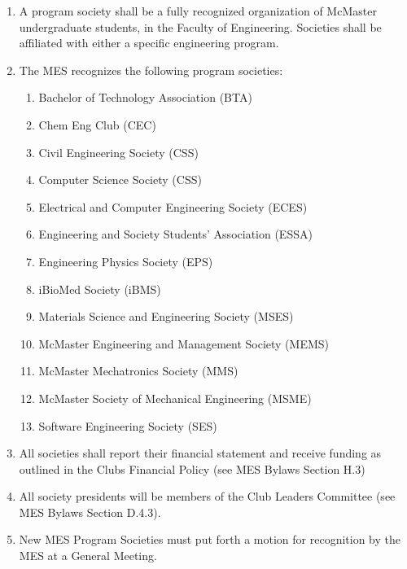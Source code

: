 \begin{enumerate}
 \item
  A program society shall be a fully recognized organization of McMaster
  undergraduate students, in the Faculty of Engineering. Societies shall
  be affiliated with either a specific engineering program.
 \item
  The MES recognizes the following program societies:

  \begin{enumerate}
   \item
    Bachelor of Technology Association (BTA)
   \item
    Chem Eng Club (CEC)
   \item
    Civil Engineering Society (CSS)
   \item
    Computer Science Society (CSS)
   \item
    Electrical and Computer Engineering Society (ECES)
   \item
    Engineering and Society Students' Association (ESSA)
   \item
    Engineering Physics Society (EPS)
   \item
    iBioMed Society (iBMS)
   \item
    Materials Science and Engineering Society (MSES)
   \item
    McMaster Engineering and Management Society (MEMS)
   \item
    McMaster Mechatronics Society (MMS)
   \item
    McMaster Society of Mechanical Engineering (MSME)
   \item
    Software Engineering Society (SES)
  \end{enumerate}
 \item
  All societies shall report their financial statement and receive
  funding as outlined in the Clubs Financial Policy (see MES Bylaws
  Section H.3)
 \item
  All society presidents will be members of the Club Leaders Committee
  (see MES Bylaws Section D.4.3).
 \item
  New MES Program Societies must put forth a motion for recognition by
  the MES at a General Meeting.

\end{enumerate}

